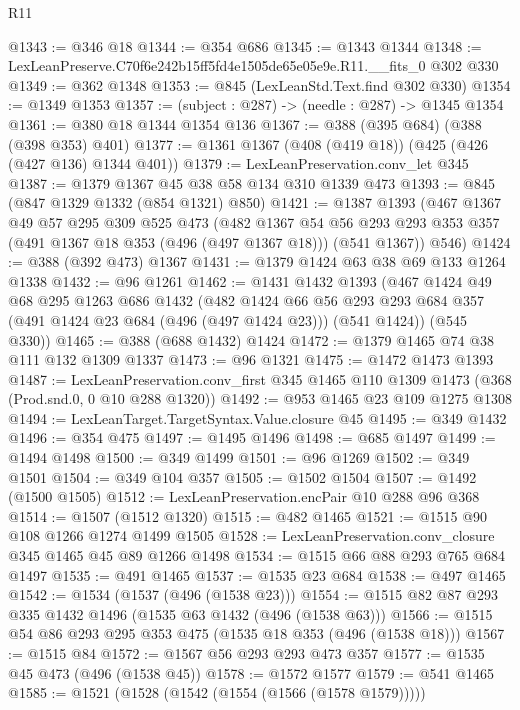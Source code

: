 \begin{lexlean}{R11}
\begin{coremodule}
@1343 := @346 @18
@1344 := @354 @686
@1345 := @1343 @1344
@1348 := LexLeanPreserve.C70f6e242b15ff5fd4e1505de65e05e9e.R11.__fits_0 @302 @330
@1349 := @362 @1348
@1353 := @845 (LexLeanStd.Text.find @302 @330)
@1354 := @1349 @1353
@1357 := (subject : @287) -> (needle : @287) -> @1345 @1354
@1361 := @380 @18 @1344 @1354 @136
@1367 := @388 (@395 @684) (@388 (@398 @353) @401)
@1377 := @1361 @1367 (@408 (@419 @18)) (@425 (@426 (@427 @136) @1344 @401))
@1379 := LexLeanPreservation.conv_let @345
@1387 := @1379 @1367 @45 @38 @58 @134 @310 @1339 @473
@1393 := @845 (@847 @1329 @1332 (@854 @1321) @850)
@1421 := @1387
    @1393
    (@467
      @1367
      @49
      @57
      @295
      @309
      @525
      @473
      (@482
        @1367
        @54
        @56
        @293
        @293
        @353
        @357
        (@491 @1367 @18 @353 (@496 (@497 @1367 @18)))
        (@541 @1367))
      @546)
@1424 := @388 (@392 @473) @1367
@1431 := @1379 @1424 @63 @38 @69 @133 @1264 @1338
@1432 := @96 @1261
@1462 := @1431
    @1432
    @1393
    (@467
      @1424
      @49
      @68
      @295
      @1263
      @686
      @1432
      (@482
        @1424
        @66
        @56
        @293
        @293
        @684
        @357
        (@491 @1424 @23 @684 (@496 (@497 @1424 @23)))
        (@541 @1424))
      (@545 @330))
@1465 := @388 (@688 @1432) @1424
@1472 := @1379 @1465 @74 @38 @111 @132 @1309 @1337
@1473 := @96 @1321
@1475 := @1472 @1473 @1393
@1487 := LexLeanPreservation.conv_first
    @345
    @1465
    @110
    @1309
    @1473
    (@368 (Prod.snd.{0, 0} @10 @288 @1320))
@1492 := @953 @1465 @23 @109 @1275 @1308
@1494 := LexLeanTarget.TargetSyntax.Value.closure @45
@1495 := @349 @1432
@1496 := @354 @475
@1497 := @1495 @1496
@1498 := @685 @1497
@1499 := @1494 @1498
@1500 := @349 @1499
@1501 := @96 @1269
@1502 := @349 @1501
@1504 := @349 @104 @357
@1505 := @1502 @1504
@1507 := @1492 (@1500 @1505)
@1512 := LexLeanPreservation.encPair @10 @288 @96 @368
@1514 := @1507 (@1512 @1320)
@1515 := @482 @1465
@1521 := @1515 @90 @108 @1266 @1274 @1499 @1505
@1528 := LexLeanPreservation.conv_closure @345 @1465 @45 @89 @1266 @1498
@1534 := @1515 @66 @88 @293 @765 @684 @1497
@1535 := @491 @1465
@1537 := @1535 @23 @684
@1538 := @497 @1465
@1542 := @1534 (@1537 (@496 (@1538 @23)))
@1554 := @1515 @82 @87 @293 @335 @1432 @1496 (@1535 @63 @1432 (@496 (@1538 @63)))
@1566 := @1515 @54 @86 @293 @295 @353 @475 (@1535 @18 @353 (@496 (@1538 @18)))
@1567 := @1515 @84
@1572 := @1567 @56 @293 @293 @473 @357
@1577 := @1535 @45 @473 (@496 (@1538 @45))
@1578 := @1572 @1577
@1579 := @541 @1465
@1585 := @1521 (@1528 (@1542 (@1554 (@1566 (@1578 @1579)))))

\end{coremodule}
\end{lexlean}
